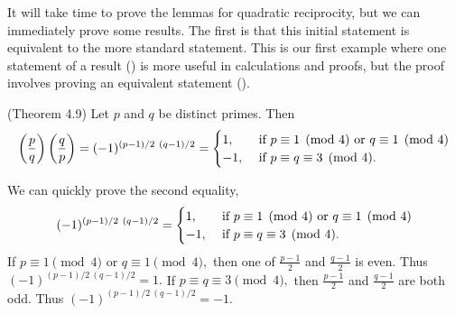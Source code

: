 \documentclass{../ximera}
\begin{document}
It will take time to prove the lemmas for quadratic reciprocity, but we can immediately prove some results. 
The first is that this initial statement is equivalent to the more standard statement. This is our first example where one statement of a result () is more useful in calculations and proofs, but the proof involves proving an equivalent statement ().

\begin{thm*}\label{quad-rec-standard-form} (Theorem 4.9)
	Let $p$ and $q$ be distinct primes.  Then
	\[
		\legendre{p}{q}\legendre{q}{p}=(-1)^{(p-1)/2\ (q-1)/2}=
			\begin{cases}
 				1, & \textnormal{ if } p\equiv 1\pmod{4} \textnormal{ or } q\equiv 1\pmod{4}\\
				-1, & \textnormal{ if } p\equiv q\equiv 3\pmod{4}.
			\end{cases}
	\]
\end{thm*}

\begin{remark}
	We can quickly prove the second equality, 
		\[(-1)^{(p-1)/2\ (q-1)/2}=
			\begin{cases}
 				1, & \textnormal{ if } p\equiv 1\pmod{4} \textnormal{ or } q\equiv 1\pmod{4}\\
				-1, & \textnormal{ if } p\equiv q\equiv 3\pmod{4}.
			\end{cases}\]
	If $p\equiv 1\pmod{4}$ or $q\equiv 1\pmod{4},$ then one of $\frac{p-1}{2}$ and $\frac{q-1}{2}$ is even. Thus $(-1)^{(p-1)/2\ (q-1)/2}=1.$ If $p\equiv q\equiv 3\pmod{4},$ then $\frac{p-1}{2}$ and $\frac{q-1}{2}$ are both odd. Thus $(-1)^{(p-1)/2\ (q-1)/2}=-1.$
\end{remark}
\end{document}
